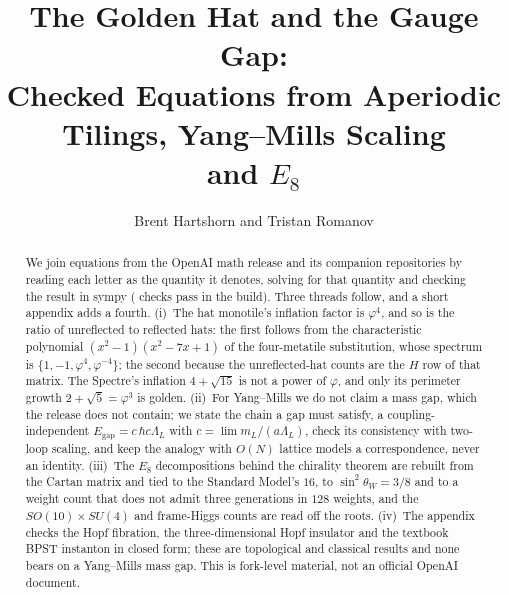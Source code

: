 \documentclass[10pt]{article}
\title{The Golden Hat and the Gauge Gap:\\ Checked Equations from Aperiodic Tilings, Yang--Mills Scaling\\ and $E_8$}
\author{Brent Hartshorn \orcidlink{0009-0004-2853-655X}
        and Tristan Romanov}
\date{}
\begin{document}
\maketitle

\begin{abstract}
\noindent
We join equations from the OpenAI math release and its companion repositories by reading each letter as the
quantity it denotes, solving for that quantity and checking the result in sympy (\nChecks{} checks pass in the build).
Three threads follow, and a short appendix adds a fourth. (i)~The hat monotile's inflation factor is $\varphi^4$, and so is the ratio of unreflected to
reflected hats: the first follows from the characteristic polynomial $(x^2-1)(x^2-7x+1)$ of the four-metatile
substitution, whose spectrum is $\{1,-1,\varphi^4,\varphi^{-4}\}$; the second because the unreflected-hat counts are the
$H$ row of that matrix. The Spectre's inflation $4+\sqrt{15}$ is not a power of $\varphi$, and only its perimeter growth
$2+\sqrt5=\varphi^3$ is golden. (ii)~For Yang--Mills we do not claim a mass gap, which the release does not contain;
we state the chain a gap must satisfy, a coupling-independent $E_{\mathrm{gap}}=c\,\hbar c\Lambda_L$ with
$c=\lim m_L/(a\Lambda_L)$, check its consistency with two-loop scaling, and keep the analogy with $O(N)$ lattice
models a correspondence, never an identity. (iii)~The $E_8$ decompositions behind the chirality theorem are rebuilt from
the Cartan matrix and tied to the Standard Model's $16$, to $\sin^2\theta_W=3/8$ and to a weight count that does not
admit three generations in $128$ weights, and the $SO(10)\times SU(4)$ and frame-Higgs counts are read off the roots.
(iv)~The appendix checks the Hopf fibration, the three-dimensional Hopf insulator and the textbook BPST instanton in
closed form; these are topological and classical results and none bears on a Yang--Mills mass gap. This is fork-level material, not an official OpenAI document.
\end{abstract}




\end{document}
